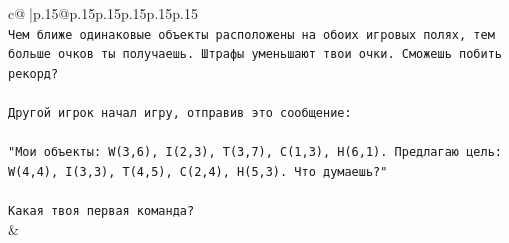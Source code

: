 \documentclass{article}
\begin{document}
{\begin{supertabular}{c@{$\;$}|p{.15\linewidth}@{}p{.15\linewidth}p{.15\linewidth}p{.15\linewidth}p{.15\linewidth}p{.15\linewidth}}
{{{\\ 
\texttt{Чем ближе одинаковые объекты расположены на обоих игровых полях, тем больше очков ты получаешь. Штрафы уменьшают твои очки. Сможешь побить рекорд?} \\
\\ 
\texttt{Другой игрок начал игру, отправив это сообщение:} \\
\\ 
\texttt{"Мои объекты: W(3,6), I(2,3), T(3,7), C(1,3), H(6,1). Предлагаю цель: W(4,4), I(3,3), T(4,5), C(2,4), H(5,3). Что думаешь?"} \\
\\ 
\texttt{Какая твоя первая команда?} \\
            }
        }
    }
    & \\ \\


\end{supertabular}}
\end{document}
